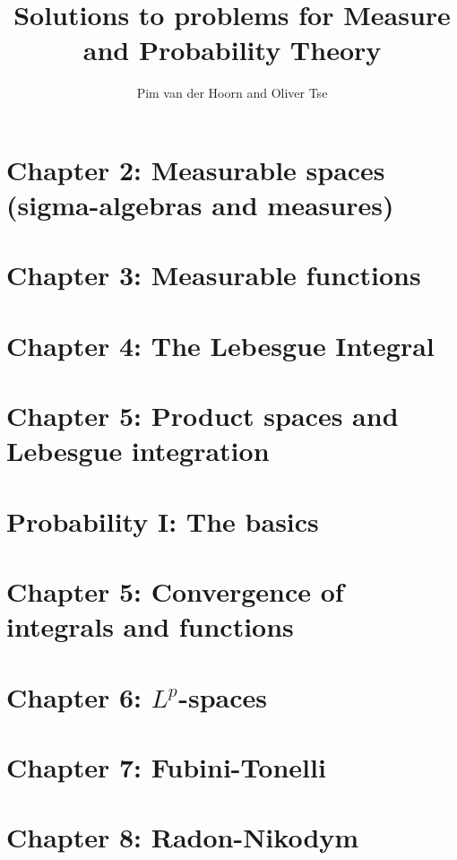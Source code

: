 \documentclass{lecturenotes}
\begin{document}
\begin{titlepage}
    \title{Solutions to problems for Measure and Probability Theory}
    \author{Pim van der Hoorn and Oliver Tse}
    \maketitle
\end{titlepage}


\section*{Chapter 2: Measurable spaces (sigma-algebras and measures)}



\section*{Chapter 3: Measurable functions}



\section*{Chapter 4: The Lebesgue Integral}


\section*{Chapter 5: Product spaces and Lebesgue integration}



\section*{Probability I: The basics}






\section*{Chapter 5: Convergence of integrals and functions}


\section*{Chapter 6: $L^p$-spaces}


\section*{Chapter 7: Fubini-Tonelli}


\section*{Chapter 8: Radon-Nikodym}

\end{document}
